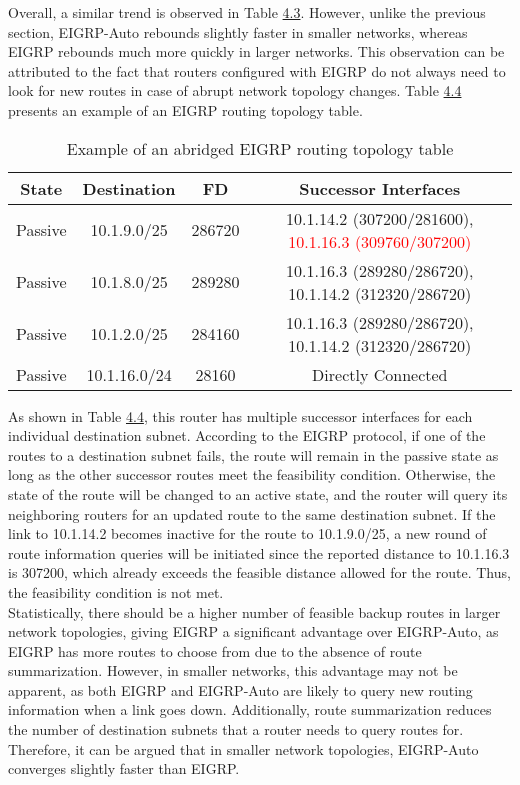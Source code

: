 \documentclass{uiucthesis2021}
\begin{document}
\noindent Overall, a similar trend is observed in Table \hyperref[t43]{4.3}. However, unlike the previous section, EIGRP-Auto rebounds slightly faster in smaller networks, whereas EIGRP rebounds much more quickly in larger networks. This observation can be attributed to the fact that routers configured with EIGRP do not always need to look for new routes in case of abrupt network topology changes. Table \hyperref[t44]{4.4} presents an example of an EIGRP routing topology table.\\

\label{t44}
\begin{table}[!h]
\begin{center}
\begin{tabular}{|c|c|c|c|}
 \hline
  State & Destination & FD & Successor Interfaces\\
 \hline\hline
 Passive & 10.1.9.0/25 & 286720 & 10.1.14.2 (307200/281600), \textcolor{red}{10.1.16.3 (309760/307200)}\\
 \hline
 Passive & 10.1.8.0/25 & 289280 & 10.1.16.3 (289280/286720), 10.1.14.2 (312320/286720)\\
 \hline
 Passive & 10.1.2.0/25 & 284160 & 10.1.16.3 (289280/286720), 10.1.14.2 (312320/286720)\\
 \hline
 Passive & 10.1.16.0/24 & 28160 & Directly Connected\\
 \hline
\end{tabular}
\caption{Example of an abridged EIGRP routing topology table}
\end{center}
\end{table}

\noindent As shown in Table \hyperref[t44]{4.4}, this router has multiple successor interfaces for each individual destination subnet. According to the EIGRP protocol, if one of the routes to a destination subnet fails, the route will remain in the passive state as long as the other successor routes meet the feasibility condition. Otherwise, the state of the route will be changed to an active state, and the router will query its neighboring routers for an updated route to the same destination subnet. If the link to 10.1.14.2 becomes inactive for the route to 10.1.9.0/25, a new round of route information queries will be initiated since the reported distance to 10.1.16.3 is 307200, which already exceeds the feasible distance allowed for the route. Thus, the feasibility condition is not met. \\

\noindent Statistically, there should be a higher number of feasible backup routes in larger network topologies, giving EIGRP a significant advantage over EIGRP-Auto, as EIGRP has more routes to choose from due to the absence of route summarization. However, in smaller networks, this advantage may not be apparent, as both EIGRP and EIGRP-Auto are likely to query new routing information when a link goes down. Additionally, route summarization reduces the number of destination subnets that a router needs to query routes for. Therefore, it can be argued that in smaller network topologies, EIGRP-Auto converges slightly faster than EIGRP.
\end{document}
